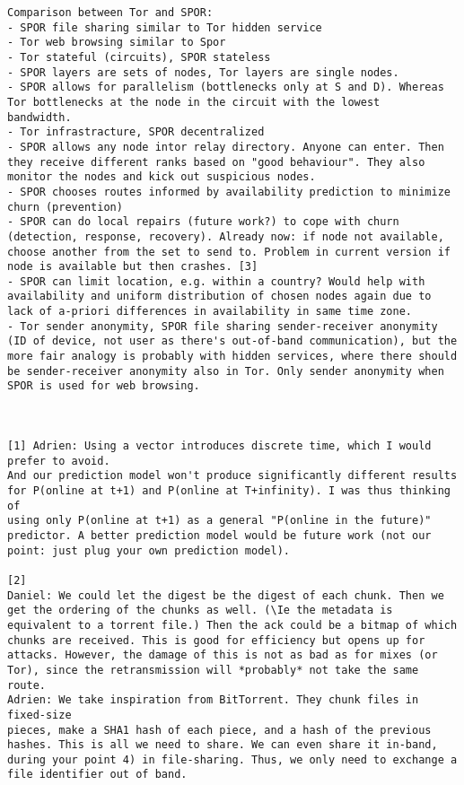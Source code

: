 \begin{verbatim}
Comparison between Tor and SPOR:
- SPOR file sharing similar to Tor hidden service
- Tor web browsing similar to Spor
- Tor stateful (circuits), SPOR stateless
- SPOR layers are sets of nodes, Tor layers are single nodes.
- SPOR allows for parallelism (bottlenecks only at S and D). Whereas Tor bottlenecks at the node in the circuit with the lowest 
bandwidth.
- Tor infrastracture, SPOR decentralized
- SPOR allows any node intor relay directory. Anyone can enter. Then they receive different ranks based on "good behaviour". They also monitor the nodes and kick out suspicious nodes.
- SPOR chooses routes informed by availability prediction to minimize churn (prevention)
- SPOR can do local repairs (future work?) to cope with churn (detection, response, recovery). Already now: if node not available, choose another from the set to send to. Problem in current version if node is available but then crashes. [3]
- SPOR can limit location, e.g. within a country? Would help with availability and uniform distribution of chosen nodes again due to lack of a-priori differences in availability in same time zone.
- Tor sender anonymity, SPOR file sharing sender-receiver anonymity (ID of device, not user as there's out-of-band communication), but the more fair analogy is probably with hidden services, where there should be sender-receiver anonymity also in Tor. Only sender anonymity when SPOR is used for web browsing.



[1] Adrien: Using a vector introduces discrete time, which I would prefer to avoid.
And our prediction model won't produce significantly different results
for P(online at t+1) and P(online at T+infinity). I was thus thinking of
using only P(online at t+1) as a general "P(online in the future)"
predictor. A better prediction model would be future work (not our
point: just plug your own prediction model).

[2]
Daniel: We could let the digest be the digest of each chunk. Then we get the ordering of the chunks as well. (\Ie the metadata is equivalent to a torrent file.) Then the ack could be a bitmap of which chunks are received. This is good for efficiency but opens up for attacks. However, the damage of this is not as bad as for mixes (or Tor), since the retransmission will *probably* not take the same route.
Adrien: We take inspiration from BitTorrent. They chunk files in fixed-size
pieces, make a SHA1 hash of each piece, and a hash of the previous
hashes. This is all we need to share. We can even share it in-band,
during your point 4) in file-sharing. Thus, we only need to exchange a
file identifier out of band.


\end{verbatim}
